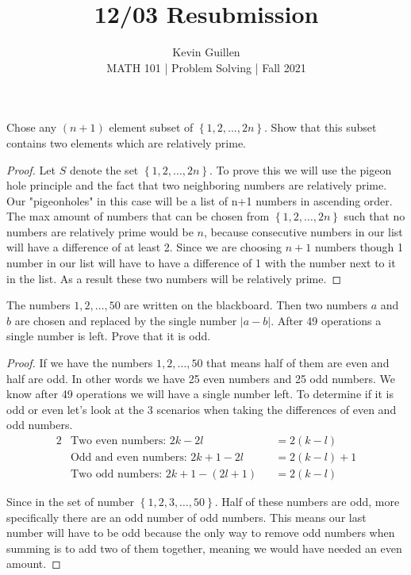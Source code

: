 \documentclass[11pt]{article}
\newenvironment{problem}[2][Problem\!]{\begin{trivlist}
\item[\hskip \labelsep {\bfseries #1}\hskip \labelsep {\bfseries #2}]}{\end{trivlist}}
\newcommand{\abs}[1]{\left\lvert#1\right\rvert} %
\newcommand{\set}[1]{\left\{#1\right\}} %
\begin{document}
 
\title{12/03 Resubmission}
\author{Kevin Guillen\\[0.5em]
MATH 101 | Problem Solving | Fall 2021}
\date{} 
\maketitle


\begin{tcolorbox}
    \begin{problem}{10/8 OC (30.)}
        Chose any $(n+1)$ element subset of $\set{1,2,\dots, 2n}$. Show that this subset contains two elements which are relatively prime. 
    \end{problem}
\end{tcolorbox}
\begin{proof}
    Let $S$ denote the set $\set{1,2,\dots,2n}$. To prove this we will use the pigeon hole principle and the fact that two neighboring numbers are relatively prime. Our "pigeonholes" in this case will be a list of n+1 numbers in ascending order.  The max amount of numbers that can be chosen from $\set{1,2, \dots , 2n}$ such that no numbers are relatively prime would be $n$, because consecutive numbers in our list will have a difference of at least 2. Since we are choosing $n+1$ numbers though 1 number in our list will have to have a difference of 1 with the number next to it in the list. As a result these two numbers will be relatively prime. 
\end{proof}

\begin{tcolorbox}
    \begin{problem}{10/11 IC (44.)} 
        The numbers $1,2,\dots, 50$ are written on the blackboard. Then two numbers $a$ and $b$ are chosen and replaced by the single number $\abs{a-b}$. After 49 operations a single number is left. Prove that it is odd. 
    \end{problem}
\end{tcolorbox}

\begin{proof}
    If we have the numbers $1,2,\dots, 50$ that means half of them are even and half are odd. In other words we have 25 even numbers and 25 odd numbers. We know after 49 operations we will have a single number left. To determine if it is odd or even let's look at the 3 scenarios when taking the differences of even and odd numbers.
    \begin{alignat*}{2}
        &\text{Two even numbers: } 2k - 2l &&= 2(k-l) \\
        &\text{Odd and even numbers: } 2k + 1 - 2l &&= 2(k-l) + 1 \\
        &\text{Two odd numbers: } 2k + 1 - (2l + 1) &&= 2(k-l)
    \end{alignat*}

    Since in the set of number $\set{1,2, 3, \dots, 50}$. Half of these numbers are odd, more specifically there are an odd number of odd numbers. This means our last number will have to be odd because the only way to remove odd numbers when summing is to add two of them together, meaning we would have needed an even amount.
\end{proof}
\newpage
\end{document}
